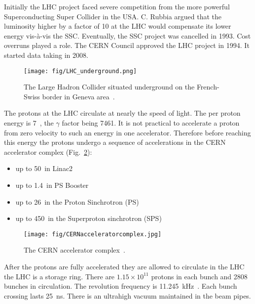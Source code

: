 Initially the LHC project faced severe competition from the more powerful Superconducting Super Collider in the USA. C. Rubbia argued that the luminosity higher by a factor of 10 at the LHC would compensate its lower energy vis-à-vis the SSC. Eventually, the SSC project was cancelled in 1993. Cost overruns played a role. The CERN Council approved the LHC project in 1994. It started data taking in 2008.

\begin{figure}[H]
  \centering
  \texttt{[image: fig/LHC\_underground.png]}
  \caption{The Large Hadron Collider situated underground on the French-Swiss border in Geneva area~\cite{cds:LHCunderground}.}
  \label{fig:LHC_underground}
\end{figure}

The protons at the LHC circulate at nearly the speed of light. The per proton energy is 7~\TeV, the $\gamma$ factor being 7461. It is not practical to accelerate a proton from zero velocity to such an energy in one accelerator. Therefore before reaching this energy the protons undergo a sequence of accelerations in the CERN accelerator complex (Fig.~\ref{fig:CERN_accelerator_complex}):

\begin{itemize}
\item up to 50~\MeV in Linac2
\item up to 1.4~\GeV in PS Booster
\item up to 26~\GeV in the Proton Sinchrotron (PS)
\item up to 450~\GeV in the Superproton sinchrotron (SPS)
\end{itemize}

\begin{figure}[H]
  \centering
  \texttt{[image: fig/CERNacceleratorcomplex.jpg]}
  \caption{The CERN accelerator complex~\cite{espace:CERNacceleratorcomplex}.}
  \label{fig:CERN_accelerator_complex}
\end{figure}

After the protons are fully accelerated they are allowed to circulate in the LHC \textendash the LHC is a storage ring. There are $1.15\times10^{11}$ protons in each bunch and 2808 bunches in circulation. The revolution frequency is 11.245~kHz~\cite{Bruning:2004ej}. Each bunch crossing lasts 25~ns. There is an ultrahigh vacuum maintained in the beam pipes.

